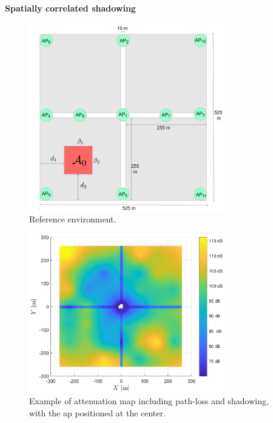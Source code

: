 \documentclass[final,twocolumn]{IEEEtran}
\begin{document}
\paragraph*{Spatially correlated shadowing} 

\begin{figure}[t]
    \centering
    \includegraphics[width=8.5cm]{scenariotex.png}
    \caption{Reference environment.} 
    \label{fig:mBS}
\end{figure}

\begin{figure}[t]
    \centering
    \includegraphics[width=8.5cm]{map.eps}
    \caption{Example of attenuation map including path-loss and shadowing, with the \ac{ap} positioned at the center.}
    \label{fig:map}
\end{figure}
\end{document}
